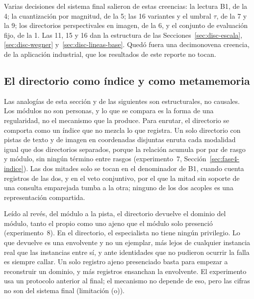 Varias decisiones del sistema final salieron de estas creencias: la lectura B1, de la
4; la cuantización por magnitud, de la 5; las 16 variantes y el umbral $\tau$, de la 7 y
la 9; los directorios perspectivales en imagen, de la 6, y el conjunto de evaluación
fijo, de la 1.
Las 11, 15 y 16 dan la estructura de las Secciones~\ref{sec:disc-escala},
\ref{sec:disc-wegner} y~\ref{sec:disc-lineas-base}.
Quedó fuera una decimonovena creencia, de la aplicación industrial, que los resultados de
este reporte no tocan.

\subsection{El directorio como índice y como metamemoria}
\label{fase:disc-metamemoria}

Las analogías de esta sección y de las siguientes son estructurales, no causales.
Los módulos no son personas, y lo que se compara es la forma de una regularidad, no el
mecanismo que la produce.
Para enrutar, el directorio se comporta como un índice que no mezcla lo que registra.
Un solo directorio con pistas de texto y de imagen en coordenadas disjuntas enruta cada
modalidad igual que dos directorios separados, porque la relación acumula por par de
rasgo y módulo, sin ningún término entre rasgos (experimento~7,
Sección~\ref{sec:fase4-indice}).
Las dos mitades solo se tocan en el denominador de B1, cuando cuenta registros de las
dos, y en el veto conjuntivo, por el que la mitad sin soporte de una consulta emparejada
tumba a la otra; ninguno de los dos acoples es una representación compartida.

Leído al revés, del módulo a la pista, el directorio devuelve el dominio del módulo,
tanto el propio como uno ajeno que el módulo solo presenció (experimento~8).
En el directorio, el especialista no tiene ningún privilegio.
Lo que devuelve es una envolvente y no un ejemplar, más lejos de cualquier instancia
real que las instancias entre sí, y ante identidades que no pudieron ocurrir la falla es
siempre callar.
Un solo registro ajeno presenciado basta para empezar a reconstruir un dominio, y más
registros ensanchan la envolvente.
El experimento usa un protocolo anterior al final; el mecanismo no depende de eso, pero
las cifras no son del sistema final (limitación (o)).

